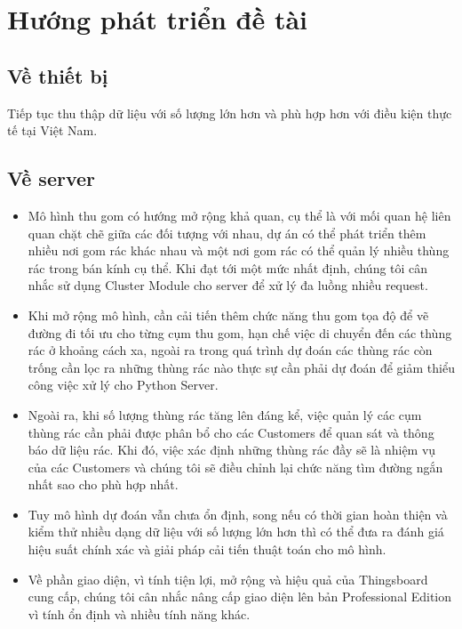 \section{Hướng phát triển đề tài}
\subsection{Về thiết bị}
Tiếp tục thu thập dữ liệu với số lượng lớn hơn và phù hợp hơn với điều kiện thực tế tại Việt Nam.

\subsection{Về server}
\begin{itemize}
    \item Mô hình thu gom có hướng mở rộng khả quan, cụ thể là với mối quan hệ liên quan chặt chẽ giữa các đối tượng với nhau, dự án có thể phát triển thêm nhiều nơi gom rác khác nhau và một nơi gom rác có thể quản lý nhiều thùng rác trong bán kính cụ thể. Khi đạt tới một mức nhất định, chúng tôi cân nhắc sử dụng Cluster Module cho server để xử lý đa luồng nhiều request.
    \item Khi mở rộng mô hình, cần cải tiến thêm chức năng thu gom tọa độ để vẽ đường đi tối ưu cho từng cụm thu gom, hạn chế việc di chuyển đến các thùng rác ở khoảng cách xa, ngoài ra trong quá trình dự đoán các thùng rác còn trống cần lọc ra những thùng rác nào thực sự cần phải dự đoán để giảm thiểu công việc xử lý cho Python Server.
    \item Ngoài ra, khi số lượng thùng rác tăng lên đáng kể, việc quản lý các cụm thùng rác cần phải được phân bổ cho các Customers để quan sát và thông báo dữ liệu rác. Khi đó, việc xác định những thùng rác đầy sẽ là nhiệm vụ của các Customers và chúng tôi sẽ điều chỉnh lại chức năng tìm đường ngắn nhất sao cho phù hợp nhất. 
    \item Tuy mô hình dự đoán vẫn chưa ổn định, song nếu có thời gian hoàn thiện và kiểm thử nhiều dạng dữ liệu với số lượng lớn hơn thì có thể đưa ra đánh giá hiệu suất chính xác và giải pháp cải tiến thuật toán cho mô hình.   
    \item Về phần giao diện, vì tính tiện lợi, mở rộng và hiệu quả của Thingsboard cung cấp, chúng tôi cân nhắc nâng cấp giao diện lên bản Professional Edition vì tính ổn định và nhiều tính năng khác.
\end{itemize}